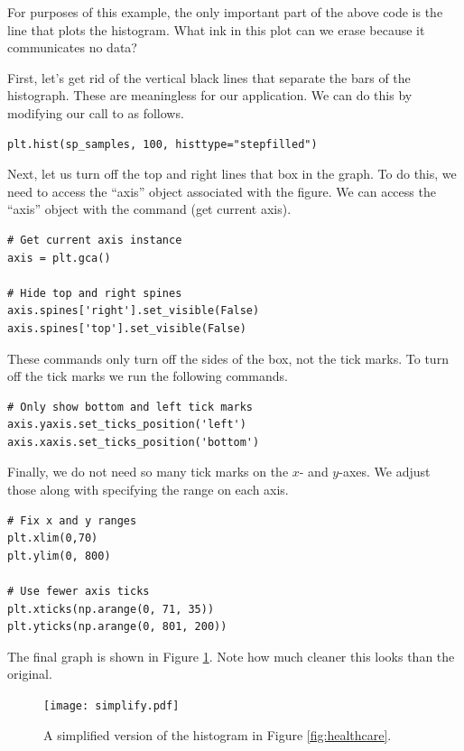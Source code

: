 For purposes of this example, the only important part of the above code is the line  that plots the histogram. 
What ink in this plot can we erase because it communicates no data?

First, let's get rid of the vertical black lines that separate the bars of the histograph. 
These are meaningless for our application. 
We can do this by modifying our call to  as follows.

\begin{lstlisting}
plt.hist(sp_samples, 100, histtype="stepfilled")
\end{lstlisting}

Next, let us turn off the top and right lines that box in the graph. 
To do this, we need to access the ``axis'' object associated with the figure. 
We can access the ``axis'' object with the command  (get current axis).

\begin{lstlisting}
# Get current axis instance
axis = plt.gca()

# Hide top and right spines
axis.spines['right'].set_visible(False)
axis.spines['top'].set_visible(False)
\end{lstlisting}

These commands only turn off the sides of the box, not the tick marks. 
To turn off the tick marks we run the following commands. 

\begin{lstlisting}
# Only show bottom and left tick marks
axis.yaxis.set_ticks_position('left')
axis.xaxis.set_ticks_position('bottom')
\end{lstlisting}

Finally, we do not need so many tick marks on the $x$- and $y$-axes. 
We adjust those along with specifying the range on each axis.

\begin{lstlisting}
# Fix x and y ranges
plt.xlim(0,70)
plt.ylim(0, 800)

# Use fewer axis ticks
plt.xticks(np.arange(0, 71, 35))
plt.yticks(np.arange(0, 801, 200))
\end{lstlisting}

The final graph is shown in Figure \ref{fig:simplify}. 
Note how much cleaner this looks than the original.

\begin{figure}
\centering
\texttt{[image: simplify.pdf]}
\caption{A simplified version of the histogram in Figure \ref{fig:healthcare}.}
\label{fig:simplify}
\end{figure}


